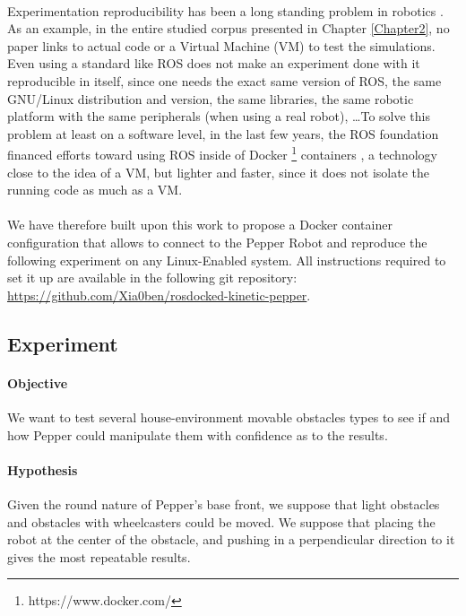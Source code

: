 \paragraph{} Experimentation reproducibility has been a long standing problem in robotics \parencite{guglielmelli_research_2015, bonsignorio_toward_2015}. As an example, in the entire studied corpus presented in Chapter \ref{Chapter2}, no paper links to actual code or a Virtual Machine (VM) to test the simulations. Even using a standard like ROS does not make an experiment done with it reproducible in itself, since one needs the exact same version of ROS, the same GNU/Linux distribution and version, the same libraries, the same robotic platform with the same peripherals (when using a real robot), \dots To solve this problem at least on a software level, in the last few years, the ROS foundation financed efforts toward using ROS inside of Docker \footnote{https://www.docker.com/} containers \parencite{white_ros_2017}, a technology close to the idea of a VM, but lighter and faster, since it does not isolate the running code as much as a VM.

\paragraph{} We have therefore built upon this work to propose a Docker container configuration that allows to connect to the Pepper Robot and reproduce the following experiment on any Linux-Enabled system. All instructions required to set it up are available in the following git repository: \\ \url{https://github.com/Xia0ben/rosdocked-kinetic-pepper}.

\subsection{Experiment}

\paragraph{Objective} We want to test several house-environment movable obstacles types to see if and how Pepper could manipulate them with confidence as to the results.

\paragraph{Hypothesis} Given the round nature of Pepper's base front, we suppose that light obstacles and obstacles with wheelcasters could be moved. We suppose that placing the robot at the center of the obstacle, and pushing in a perpendicular direction to it gives the most repeatable results.

